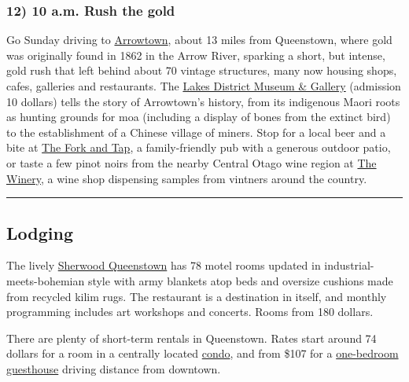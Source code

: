 \hypertarget{12-10-am-rush-the-gold}{%
\subsubsection{\texorpdfstring{\textbf{12) 10 a.m. Rush the
gold}}{12) 10 a.m. Rush the gold}}\label{12-10-am-rush-the-gold}}

Go Sunday driving to \href{https://www.arrowtown.com/}{Arrowtown}, about
13 miles from Queenstown, where gold was originally found in 1862 in the
Arrow River, sparking a short, but intense, gold rush that left behind
about 70 vintage structures, many now housing shops, cafes, galleries
and restaurants. The \href{http://www.museumqueenstown.com/}{Lakes
District Museum \& Gallery} (admission 10 dollars) tells the story of
Arrowtown's history, from its indigenous Maori roots as hunting grounds
for moa (including a display of bones from the extinct bird) to the
establishment of a Chinese village of miners. Stop for a local beer and
a bite at \href{http://www.theforkandtap.co.nz/}{The Fork and Tap}, a
family-friendly pub with a generous outdoor patio, or taste a few pinot
noirs from the nearby Central Otago wine region at
\href{https://www.thewinery.co.nz/}{The Winery}, a wine shop dispensing
samples from vintners around the country.

\begin{center}\rule{0.5\linewidth}{\linethickness}\end{center}

\hypertarget{lodging}{%
\subsection{Lodging}\label{lodging}}

The lively \href{https://sherwoodqueenstown.nz/}{Sherwood Queenstown}
has 78 motel rooms updated in industrial-meets-bohemian style with army
blankets atop beds and oversize cushions made from recycled kilim rugs.
The restaurant is a destination in itself, and monthly programming
includes art workshops and concerts. Rooms from 180 dollars.

There are plenty of short-term rentals in Queenstown. Rates start around
74 dollars for a room in a centrally located
\href{https://www.airbnb.com/rooms/4271035?adults=2\&source_impression_id=p3_1570722838_kiwb5ARjO1QVZWCW\&guests=1\&check_in=2020-03-03\&check_out=2020-03-05}{condo},
and from \$107 for a
\href{https://www.airbnb.com/rooms/30183209?adults=2\&source_impression_id=p3_1570722410_bFWtC8JflIE5SfE4\&guests=1\&check_in=2020-03-02\&check_out=2020-03-05}{one-bedroom
guesthouse} driving distance from downtown.

